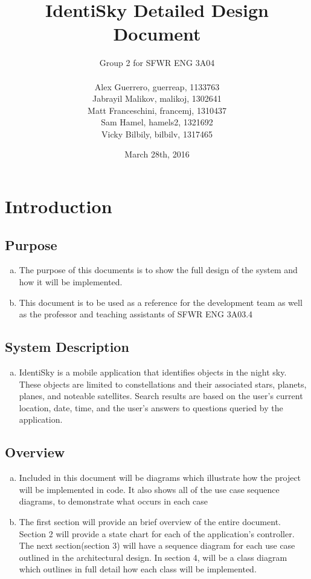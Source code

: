 \documentclass[]{article}
\title{IdentiSky Detailed Design Document}
\author{Group 2 for SFWR ENG 3A04 \\
\\ 
Alex Guerrero, guerreap, 1133763 \\
Jabrayil Malikov, malikoj, 1302641 \\
Matt Franceschini, francemj, 1310437 \\
Sam Hamel, hamels2, 1321692 \\
Vicky Bilbily, bilbilv, 1317465 \\
}
\date{March 28th, 2016}
\begin{document}
\maketitle	

\section{Introduction}
\label{sec:introduction}


\subsection{Purpose}
\label{sub:purpose}
\begin{enumerate}[a)]
	\item The purpose of this documents is to show the full design of the system and how it will be implemented.
	\item This document is to be used as a reference for the development team as well as the professor and teaching assistants of SFWR ENG 3A03.4

\end{enumerate}

\subsection{System Description}
\label{sub:system_description}
\begin{enumerate}[a)]
	\item IdentiSky is a mobile application that identifies objects in the night sky. These objects are limited to constellations and their associated stars, planets, planes, and noteable satellites. Search results are based on the user's current location, date, time, and the user's answers to questions queried by the application. 

\end{enumerate}

\subsection{Overview}
\label{sub:overview}
\begin{enumerate}[a)]

	\item Included in this document will be diagrams which illustrate how the project will be implemented in code. It also shows all of the use case sequence diagrams, to demonstrate what occurs in each case

	\item The first section will provide an brief overview of the entire document. Section 2 will provide a state chart for each of the application's controller. The next section(section 3) will have a sequence diagram for each use case outlined in the architectural design. In section 4, will be a class diagram which outlines in full detail how each class will be implemented.
	
\end{enumerate}
\end{document}
